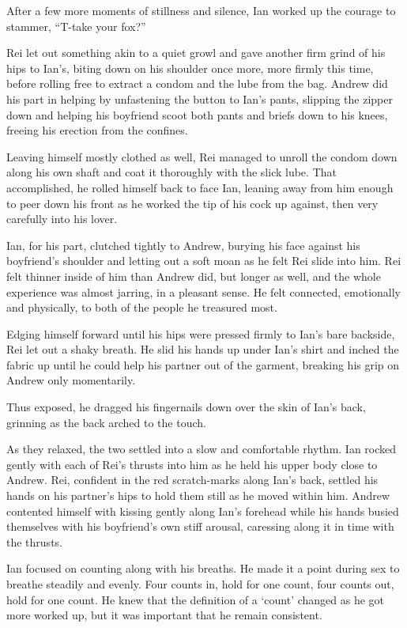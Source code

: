 After a few more moments of stillness and silence, Ian worked up the courage to stammer, ``T-take your fox?''

Rei let out something akin to a quiet growl and gave another firm grind of his hips to Ian's, biting down on his shoulder once more, more firmly this time, before rolling free to extract a condom and the lube from the bag. Andrew did his part in helping by unfastening the button to Ian's pants, slipping the zipper down and helping his boyfriend scoot both pants and briefs down to his knees, freeing his erection from the confines.

Leaving himself mostly clothed as well, Rei managed to unroll the condom down along his own shaft and coat it thoroughly with the slick lube. That accomplished, he rolled himself back to face Ian, leaning away from him enough to peer down his front as he worked the tip of his cock up against, then very carefully into his lover.

Ian, for his part, clutched tightly to Andrew, burying his face against his boyfriend's shoulder and letting out a soft moan as he felt Rei slide into him. Rei felt thinner inside of him than Andrew did, but longer as well, and the whole experience was almost jarring, in a pleasant sense. He felt connected, emotionally and physically, to both of the people he treasured most.

Edging himself forward until his hips were pressed firmly to Ian's bare backside, Rei let out a shaky breath. He slid his hands up under Ian's shirt and inched the fabric up until he could help his partner out of the garment, breaking his grip on Andrew only momentarily.

Thus exposed, he dragged his fingernails down over the skin of Ian's back, grinning as the back arched to the touch.

As they relaxed, the two settled into a slow and comfortable rhythm. Ian rocked gently with each of Rei's thrusts into him as he held his upper body close to Andrew. Rei, confident in the red scratch-marks along Ian's back, settled his hands on his partner's hips to hold them still as he moved within him. Andrew contented himself with kissing gently along Ian's forehead while his hands busied themselves with his boyfriend's own stiff arousal, caressing along it in time with the thrusts.

Ian focused on counting along with his breaths. He made it a point during sex to breathe steadily and evenly. Four counts in, hold for one count, four counts out, hold for one count. He knew that the definition of a `count' changed as he got more worked up, but it was important that he remain consistent.


